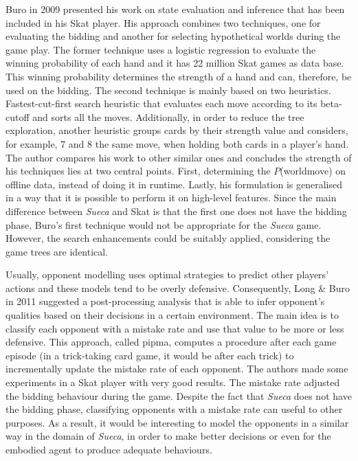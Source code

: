 Buro in 2009 \cite{Buro} presented his work on state evaluation and inference that has been included in his Skat player.
His approach combines two techniques, one for evaluating the bidding and another for selecting hypothetical worlds during the game play.
The former technique uses a logistic regression to evaluate the winning probability of each hand and it has 22 million Skat games as data base.
This winning probability determines the strength of a hand and can, therefore, be used on the bidding.
The second technique is mainly based on two heuristics.
Fastest-cut-first search heuristic that evaluates each move according to its beta-cutoff and sorts all the moves.
Additionally, in order to reduce the tree exploration, another heuristic groups cards by their strength value and considers, for example, 7 and 8 the same move, when holding both cards in a player's hand.
The author compares his work to other similar ones and concludes the strength of his techniques lies at two central points.
First, determining the $P$(world\textbar move) on offline data, instead of doing it in runtime.
Lastly, his formulation is generalised in a way that it is possible to perform it on high-level features.
Since the main difference between \emph{Sueca} and Skat is that the first one does not have the bidding phase, Buro's first technique would not be appropriate for the \emph{Sueca} game.
However, the search enhancements could be suitably applied, considering the game trees are identical.


Usually, opponent modelling uses optimal strategies to predict other players' actions and these models tend to be overly defensive.
Consequently, Long \& Buro in 2011 \cite{Long2009} suggested a post-processing analysis that is able to infer opponent's qualities based on their decisions in a certain environment.
The main idea is to classify each opponent with a mistake rate and use that value to be more or less defensive.
This approach, called \gls{pipma}, computes a procedure after each game episode (in a trick-taking card game, it would be after each trick) to incrementally update the mistake rate of each opponent.
The authors made some experiments in a Skat player with very good results.
The mistake rate adjusted the bidding behaviour during the game.
Despite the fact that \emph{Sueca} does not have the bidding phase, classifying opponents with a mistake rate can useful to other purposes.
As a result, it would be interesting to model the opponents in a similar way in the domain of \emph{Sueca}, in order to make better decisions or even for the embodied agent to produce adequate behaviours.

